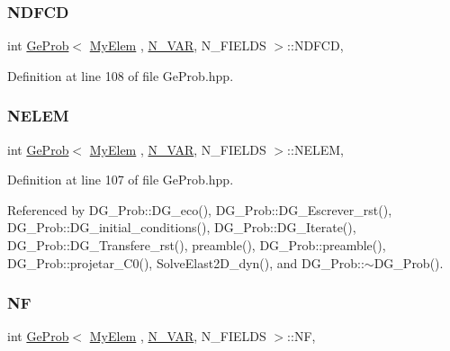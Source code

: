 \subsubsection{\texorpdfstring{N\+D\+F\+CD}{NDFCD}}
{\footnotesize\ttfamily int \hyperlink{classGeProb}{Ge\+Prob}$<$ \hyperlink{DG__Prob_8h_a83cd887ced9a6587428f267e50cd4787}{My\+Elem} , \hyperlink{classED__Prob_a4e7d2ff1a8e435e336fb00c527224b5a}{N\+\_\+\+V\+AR}, N\+\_\+\+F\+I\+E\+L\+DS $>$\+::N\+D\+F\+CD\hspace{0.3cm}{\ttfamily [protected]}, {\ttfamily [inherited]}}



Definition at line 108 of file Ge\+Prob.\+hpp.

\mbox{\label{classGeProb_ac5a0f21b0737394d783b9ca32317ece8}} 
\subsubsection{\texorpdfstring{N\+E\+L\+EM}{NELEM}}
{\footnotesize\ttfamily int \hyperlink{classGeProb}{Ge\+Prob}$<$ \hyperlink{DG__Prob_8h_a83cd887ced9a6587428f267e50cd4787}{My\+Elem} , \hyperlink{classED__Prob_a4e7d2ff1a8e435e336fb00c527224b5a}{N\+\_\+\+V\+AR}, N\+\_\+\+F\+I\+E\+L\+DS $>$\+::N\+E\+L\+EM\hspace{0.3cm}{\ttfamily [protected]}, {\ttfamily [inherited]}}



Definition at line 107 of file Ge\+Prob.\+hpp.



Referenced by D\+G\+\_\+\+Prob\+::\+D\+G\+\_\+eco(), D\+G\+\_\+\+Prob\+::\+D\+G\+\_\+\+Escrever\+\_\+rst(), D\+G\+\_\+\+Prob\+::\+D\+G\+\_\+initial\+\_\+conditions(), D\+G\+\_\+\+Prob\+::\+D\+G\+\_\+\+Iterate(), D\+G\+\_\+\+Prob\+::\+D\+G\+\_\+\+Transfere\+\_\+rst(), preamble(), D\+G\+\_\+\+Prob\+::preamble(), D\+G\+\_\+\+Prob\+::projetar\+\_\+\+C0(), Solve\+Elast2\+D\+\_\+dyn(), and D\+G\+\_\+\+Prob\+::$\sim$\+D\+G\+\_\+\+Prob().

\mbox{\label{classGeProb_a4168b4f9002df61cb396728b9eecbdca}} 
\subsubsection{\texorpdfstring{NF}{NF}}
{\footnotesize\ttfamily int \hyperlink{classGeProb}{Ge\+Prob}$<$ \hyperlink{DG__Prob_8h_a83cd887ced9a6587428f267e50cd4787}{My\+Elem} , \hyperlink{classED__Prob_a4e7d2ff1a8e435e336fb00c527224b5a}{N\+\_\+\+V\+AR}, N\+\_\+\+F\+I\+E\+L\+DS $>$\+::NF\hspace{0.3cm}{\ttfamily [protected]}, {\ttfamily [inherited]}}




